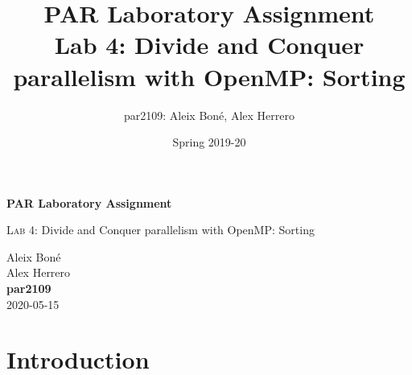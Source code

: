 

\usepackage[justification=centering]{caption}
\usepackage{subcaption}
\usepackage{graphicx}
\usepackage{enumitem}
\usepackage{lipsum}

\usepackage{siunitx}
\usepackage{hyphenat}

\usepackage{xcolor}


\usepackage[newfloat]{minted}
\captionsetup[listing]{position=top}


\renewcommand\theadfont{\bfseries}

\title{
    PAR Laboratory Assignment\\
    Lab 4: Divide and Conquer parallelism with OpenMP: Sorting
}

\author{
    par2109:
    Aleix Boné,
    Alex Herrero
}

\date{
    Spring 2019-20
}



\thispagestyle{empty}
\clearpage
\setcounter{page}{-1}

\begin{titlepage}
{
    \centering
    \null
    \vfill
    {\Huge \bfseries PAR Laboratory Assignment\par}
    \vspace{3em}
    {\Large {\scshape Lab 4:} Divide and Conquer parallelism with OpenMP: Sorting \par}
    \vfill
\begin{center}
\end{center}
    \vspace{3cm}

    \vfill
    {\raggedleft \Large
        Aleix Boné\\
        Alex Herrero\\
        {\bfseries\ttfamily par2109}\\
        \vspace{4em}
        2020-05-15
        \par}
}
\end{titlepage}

\tableofcontents
\pagebreak

\section{Introduction}%
\label{sec:intro}

